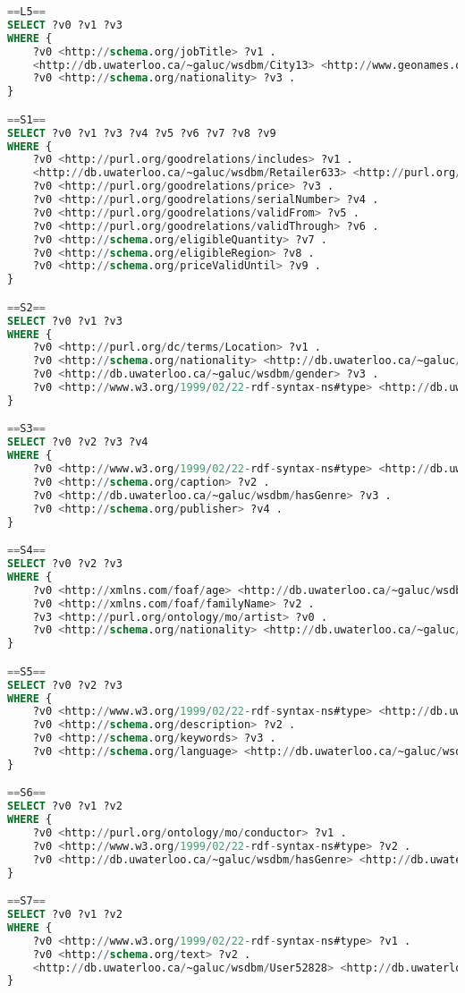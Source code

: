 \begin{lstlisting}[language=SQL, basicstyle=\ttfamily\scriptsize,morekeywords={PREFIX,OPTIONAL,FILTER,java,rdf,rdfs,url},breaklines=true,showstringspaces=false,label=watdiv-sparql-queries,basewidth=0.5em]
==L5==
SELECT ?v0 ?v1 ?v3 
WHERE {
    ?v0 <http://schema.org/jobTitle> ?v1 .
    <http://db.uwaterloo.ca/~galuc/wsdbm/City13> <http://www.geonames.org/ontology#parentCountry> ?v3 .
    ?v0 <http://schema.org/nationality> ?v3 .
}

==S1==
SELECT ?v0 ?v1 ?v3 ?v4 ?v5 ?v6 ?v7 ?v8 ?v9 
WHERE {
    ?v0 <http://purl.org/goodrelations/includes> ?v1 .
    <http://db.uwaterloo.ca/~galuc/wsdbm/Retailer633> <http://purl.org/goodrelations/offers> ?v0 .
    ?v0 <http://purl.org/goodrelations/price> ?v3 .
    ?v0 <http://purl.org/goodrelations/serialNumber> ?v4 .
    ?v0 <http://purl.org/goodrelations/validFrom> ?v5 .
    ?v0 <http://purl.org/goodrelations/validThrough> ?v6 .
    ?v0 <http://schema.org/eligibleQuantity> ?v7 .
    ?v0 <http://schema.org/eligibleRegion> ?v8 .
    ?v0 <http://schema.org/priceValidUntil> ?v9 .
}

==S2==
SELECT ?v0 ?v1 ?v3 
WHERE {
    ?v0 <http://purl.org/dc/terms/Location> ?v1 .
    ?v0 <http://schema.org/nationality> <http://db.uwaterloo.ca/~galuc/wsdbm/Country8> .
    ?v0 <http://db.uwaterloo.ca/~galuc/wsdbm/gender> ?v3 .
    ?v0 <http://www.w3.org/1999/02/22-rdf-syntax-ns#type> <http://db.uwaterloo.ca/~galuc/wsdbm/Role2> .
}

==S3==
SELECT ?v0 ?v2 ?v3 ?v4 
WHERE {
    ?v0 <http://www.w3.org/1999/02/22-rdf-syntax-ns#type> <http://db.uwaterloo.ca/~galuc/wsdbm/ProductCategory9> .
    ?v0 <http://schema.org/caption> ?v2 .
    ?v0 <http://db.uwaterloo.ca/~galuc/wsdbm/hasGenre> ?v3 .
    ?v0 <http://schema.org/publisher> ?v4 .
}

==S4==
SELECT ?v0 ?v2 ?v3 
WHERE {
    ?v0 <http://xmlns.com/foaf/age> <http://db.uwaterloo.ca/~galuc/wsdbm/AgeGroup0> .
    ?v0 <http://xmlns.com/foaf/familyName> ?v2 .
    ?v3 <http://purl.org/ontology/mo/artist> ?v0 .
    ?v0 <http://schema.org/nationality> <http://db.uwaterloo.ca/~galuc/wsdbm/Country1> .
}

==S5==
SELECT ?v0 ?v2 ?v3 
WHERE {
    ?v0 <http://www.w3.org/1999/02/22-rdf-syntax-ns#type> <http://db.uwaterloo.ca/~galuc/wsdbm/ProductCategory3> .
    ?v0 <http://schema.org/description> ?v2 .
    ?v0 <http://schema.org/keywords> ?v3 .
    ?v0 <http://schema.org/language> <http://db.uwaterloo.ca/~galuc/wsdbm/Language0> .
}

==S6==
SELECT ?v0 ?v1 ?v2 
WHERE {
    ?v0 <http://purl.org/ontology/mo/conductor> ?v1 .
    ?v0 <http://www.w3.org/1999/02/22-rdf-syntax-ns#type> ?v2 .
    ?v0 <http://db.uwaterloo.ca/~galuc/wsdbm/hasGenre> <http://db.uwaterloo.ca/~galuc/wsdbm/SubGenre90> .
}

==S7==
SELECT ?v0 ?v1 ?v2 
WHERE {
    ?v0 <http://www.w3.org/1999/02/22-rdf-syntax-ns#type> ?v1 .
    ?v0 <http://schema.org/text> ?v2 .
    <http://db.uwaterloo.ca/~galuc/wsdbm/User52828> <http://db.uwaterloo.ca/~galuc/wsdbm/likes> ?v0 .
}
\end{lstlisting}


